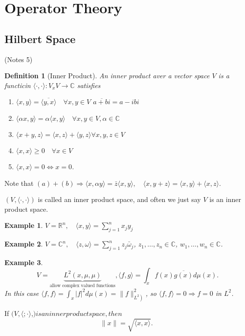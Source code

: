 \documentclass{tufte-handout}
\newtheorem{definition}{Definition}[section]
\newtheorem{example}{Example}[section]
\begin{document}
\section{Operator Theory}
\subsection{Hilbert Space}
(Notes 5)
\begin{definition}[Inner Product]
	An inner product aver a vector space $V$ is a functicin
$\langle\cdot, \cdot\rangle: V_x V \rightarrow \mathbb{C}$ satisfies
\begin{enumerate}
	\item $\langle x, y\rangle=\overline{\langle y, x\rangle} \quad \forall x, y \in V$
$\overline{a+b i}=a-i b i$
\item $\langle\alpha x, y\rangle=\alpha\langle x, y\rangle \quad \forall x, y \in V, \alpha \in \mathbb{C}$
\item $\langle x+y, z\rangle=\langle x, z\rangle+\langle y, z\rangle \forall x, y, z \in V$
\item $\langle x, x\rangle \geqslant 0 \quad \forall x \in V$
\item $\langle x, x\rangle=0 \Leftrightarrow x=0$.
\end{enumerate}
\end{definition}
Note that 
$(a)+(b) \Rightarrow\langle x, \alpha y\rangle=\bar{z}\langle x, y\rangle, \quad\langle x, y+z\rangle=\langle x, y\rangle + \langle x, z\rangle$.

$(V,\langle\cdot, \cdot\rangle)$ is called an inner product space, and often we just say $V$ is an inner product space.

\begin{example}
	$V=\mathbb{R}^n, \quad\langle x, y\rangle=\sum_{j=1}^n x_j y_j$
\end{example}
\begin{example}
	$V=\mathbb{C}^n, \quad\langle z, \omega\rangle=\sum_{j=1}^n z_j \bar{\omega}_j$, $z_1, \ldots, z_n \in \mathbb{C}$, $w_1, \ldots, w_n \in \mathbb{C}$.
\end{example}
\begin{example}
	\begin{equation*}
	V=\underbrace{L^2(x, \mu, \mu)}_{\text {allow complex valued functions}}, \langle f, g\rangle=\int_x f(x) \overline{g(x)} d \mu(x).
	\end{equation*}
	In this case $\langle f, f\rangle=\int_x|f|^2 d \mu(x)=\|f\|_{\left.L^2\right)}^2$,
	so $\langle f, f\rangle=0 \Rightarrow f=0$ in $L^2$.
\end{example}
If $(V,\langle; \cdot\rangle$,$) is an inner product space, then$
\begin{equation*}
\|x\|=\sqrt{\langle x, x\rangle} \text {. }
\end{equation*}
\end{document}

